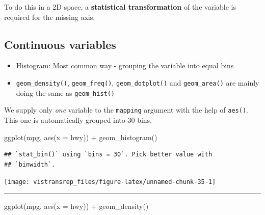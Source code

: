 \documentclass[]{book}
\newenvironment{Shaded}{}{}
\newcommand{\DataTypeTok}[1]{#1}
\newcommand{\KeywordTok}[1]{\textcolor[rgb]{0.00,0.00,1.00}{#1}}
\newcommand{\NormalTok}[1]{#1}
\newcommand{\OperatorTok}[1]{#1}
\newcommand{\StringTok}[1]{\textcolor[rgb]{0.00,0.50,0.50}{#1}}
\begin{document}
To do this in a 2D space, a \textbf{statistical transformation} of the variable is required for the missing axis.

\hypertarget{continuous-variables}{%
\subsection{Continuous variables}\label{continuous-variables}}

\begin{itemize}
\item
  Histogram: Most common way - grouping the variable into equal bins
\item
  \texttt{geom\_density()}, \texttt{geom\_freq()}, \texttt{geom\_dotplot()} and \texttt{geom\_area()} are mainly doing the same as \texttt{geom\_hist()}
\end{itemize}

We supply only \emph{one} variable to the \texttt{mapping} argument with the help of \texttt{aes()}.
This one is automatically grouped into 30 bins.

\begin{Shaded}
\begin{Highlighting}[]
\KeywordTok{ggplot}\NormalTok{(mpg, }\KeywordTok{aes}\NormalTok{(}\DataTypeTok{x =}\NormalTok{ hwy)) }\OperatorTok{+}
\StringTok{  }\KeywordTok{geom_histogram}\NormalTok{()}
\end{Highlighting}
\end{Shaded}

\begin{verbatim}
## `stat_bin()` using `bins = 30`. Pick better value with
## `binwidth`.
\end{verbatim}

\begin{flushright}\texttt{[image: vistransrep\_files/figure-latex/unnamed-chunk-35-1]} \end{flushright}

\begin{center}\rule{0.5\linewidth}{\linethickness}\end{center}

\begin{Shaded}
\begin{Highlighting}[]
\KeywordTok{ggplot}\NormalTok{(mpg, }\KeywordTok{aes}\NormalTok{(}\DataTypeTok{x =}\NormalTok{ hwy)) }\OperatorTok{+}
\StringTok{  }\KeywordTok{geom_density}\NormalTok{()}
\end{Highlighting}
\end{Shaded}
\end{document}
